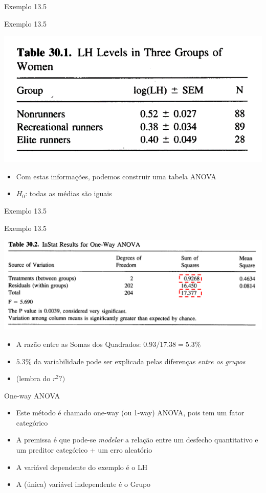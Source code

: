 \documentclass{beamer}
\begin{document}
\begin{frame}{\small Exemplo 13.5}
  \begin{exampleblock}{Exemplo 13.5}
    \begin{center}
      \includegraphics[width=.6\textwidth]{Cap13-30/exemplo13_5-1}
    \end{center}
  \begin{itemize}
  \item Com estas informações, podemos construir uma tabela ANOVA
  \item $H_0$: todas as médias são iguais
  \end{itemize}
  \end{exampleblock}
\end{frame}

\begin{frame}{\small Exemplo 13.5}
  \begin{exampleblock}{Exemplo 13.5}
    \begin{center}
      \includegraphics[width=.6\textwidth]{Cap13-30/exemplo13_5-2}
    \end{center}
  \begin{itemize}
  \item A razão entre as Somas dos Quadrados: $0.93/17.38 = 5.3\%$
  \item $5.3\%$ da variabilidade pode ser explicada pelas diferenças {\em entre os grupos}
  \item (lembra do $r^2?)$
  \end{itemize}
  \end{exampleblock}
\end{frame}

\begin{frame}{One-way ANOVA}
  \begin{itemize}
  \item Este método é chamado one-way (ou 1-way) ANOVA, pois tem um fator categórico
  \item A premissa é que pode-se {\em modelar} a relação entre um desfecho quantitativo e um preditor categórico + um erro aleatório
  \item A variável dependente do exemplo é o LH
  \item A (única) variável independente é o Grupo
  \end{itemize}
\end{frame}
\end{document}
